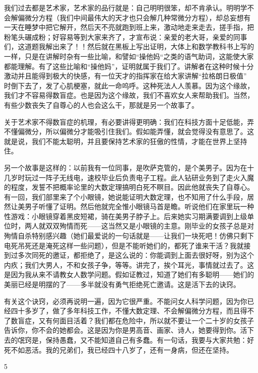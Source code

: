 我们过去都是艺术家，艺术家的品行就是：自己明明很笨，却不肯承认。明明学不会解偏微分方程（我们中间最伟大的天才也只会解几种常微分方程），却总妄想有一天在睡梦中把它解开，然后天不亮就跑到班上来，激动地走来走去，搓手指，把粉笔头碾成粉；好容易等到大家来齐了，才宣布说：亲爱的老大哥，亲爱的同事们，这道题我解出来了！！然后就在黑板上写出证明，大体上和数学教科书上写的一样，只是在讲解时杂有一些比喻，和譬如“操他妈“之类的语气助词，这能使大家都能理解。有了这些比喻和“操他妈”，证明就属于我们了。讲解者在这种时候十分激动并且能得到极大的快感，有一位天才的指挥家在给大家讲解“拉格朗日极值” 时倒下去了，发了心肌梗塞，就此一命呜呼。这种死法人人羡慕。因为这个缘故，我们才不容易得数盲症。也是因为这个缘故，我们不喜欢女人来帮助我们。当然，有些少数丧失了自尊心的人也会这么干，那就是另一个故事了。 

关于艺术家不得数盲症的机理，有必要讲得更明确：我们在科技方面十足低能，弄不懂偏微分，所以偏微分才能吸引住我们。假如能弄懂，就会觉得没有意思了。这就是说，我们不能太聪明，并且要保持艺术家的狂傲的性情，才能在世界上坚持住。 

另一个故事是这样的：以前我有一位同事，是吹萨克管的，是个美男子。因为在十几岁时玩过一阵子无线电，速校毕业后负责电子工程。此人钻研业务到了走火入魔的程度，发誓不把概率论里的大数定理搞明白死不瞑目。因此他就丧失了自尊心。有一回，我们部里来了个小眼镜，她说能证明大数定理，也不知用了什么手段，居然让美男子听懂了证明。然后他就完全惟小眼镜马首是瞻。听说他们在家里玩一种性游戏：小眼镜穿着黑皮短裙，骑在美男子脖子上。后来她实习期满要调到上级单位时，两人就双双殉情而死——这当然又是小眼镜的主意。刚毕业的女孩子总是对殉情自杀特别感兴趣（她们最爱说的一句话就是——让我们一块死吧！仿佛只剩下电死吊死还是淹死这样一些问题），但是不能听她们的，都死了谁来干活？我就接到过多次同死的邀证，都拒绝了，是这么说的：你能调到上面去很好呀，别为这个内疚；我们大男人，不和女孩子争，等等。讲完了，挨个耳光，事情就过去了。这是因为我从来不请教女人数学问题。假如证教过，知道了她们有多聪明——她们的美丽已经是明摆的了——多半就没有勇气拒绝死亡邀请。这是活下去的诀窍。 

有关这个诀窍，必须再说明一遍，因为它很严重。不能问女人科学问题，因为你已经四十多岁了，做了多年科技工作，不懂大数定理、不会解偏微分方程，而且得不了数盲症，又有何面目活着？我们都在危险中，所以就不要让一个二十岁的女孩子告诉你，你不会的她都会。这是因为你是男高音、画家、诗人，她要得到你。活下去的氓窍是，保持愚蠢，又不能知道自己有多蠢。有一句话，我要与大家共勉：好死不如恶活。我的兄弟们，我已经四十八岁了，还有一身病，但还在坚持。 

5 

